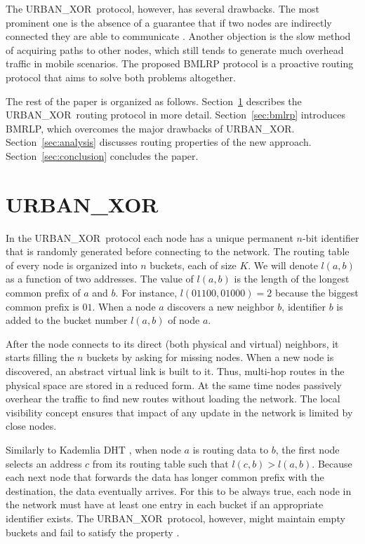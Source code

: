 \documentclass[conference]{IEEEtran}
\theoremstyle{definition}
\newcommand{\urbanxor}{URBAN\_XOR}
\begin{document}
The \urbanxor\ protocol, however, has several drawbacks. The most prominent one is the absence of a guarantee that if two nodes are indirectly connected they are able to communicate \cite{Pasquini}. Another objection is the slow method of acquiring paths to other nodes, which still tends to generate much overhead traffic in mobile scenarios. The proposed BMLRP protocol is a proactive routing protocol that aims to solve both problems altogether.

The rest of the paper is organized as follows. Section~\ref{sec:urbanxor} describes the \urbanxor\ routing protocol in more detail. Section~\ref{sec:bmlrp} introduces BMRLP, which overcomes the major drawbacks of \urbanxor. 
Section~\ref{sec:analysis} discusses routing properties of the new approach. 
Section~\ref{sec:conclusion} concludes the paper.


\section{\urbanxor}
\label{sec:urbanxor}

In the \urbanxor\ protocol each node has a unique permanent $n$-bit identifier that is randomly generated before connecting to the network. The routing table of every node is organized into $n$ buckets, each of size $K$. We will denote $l(a,b)$ as a function of two addresses. The value of $l(a,b)$ is the length of the longest common prefix of $a$ and $b$. For instance, $l(01100, 01000) = 2$ because the biggest common prefix is $01$. When a node $a$ discovers a new neighbor $b$, identifier $b$ is added to the bucket number $l(a,b)$ of node $a$.

After the node connects to its direct (both physical and virtual) neighbors, it starts filling the $n$ buckets by asking for missing nodes. When a new node is discovered, an abstract virtual link is built to it. Thus, multi-hop routes in the physical space are stored in a reduced form. At the same time nodes passively overhear the traffic to find new routes without loading the network. The local visibility concept ensures that impact of any update in the network is limited by close nodes.

Similarly to Kademlia DHT \cite{kademlia}, when node $a$ is routing data to $b$, the first node selects an address $c$ from its routing table such that $l(c,b) > l(a,b)$. Because each next node that forwards the data has longer common prefix with the destination, the data eventually arrives. For this to be always true, each node in the network must have at least one entry in each bucket if an appropriate identifier exists. The \urbanxor\ protocol, however, might maintain empty buckets and fail to satisfy the property \cite{Pasquini}.
\end{document}
